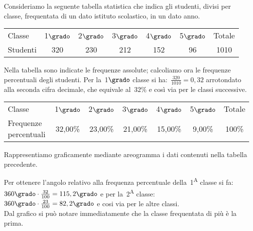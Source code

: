  \begin{esempio}
Consideriamo la seguente tabella statistica che indica gli studenti, divisi 
per classe, frequentata di un dato istituto scolastico, in un dato anno.

\begin{center}
\begin{tabular}{lcccccc}
\toprule
Classe & 1\(\grado\) &2\(\grado\) &3\(\grado\) & 4\(\grado\) &5\(\grado\) &Totale\\
Studenti & 320 & 230 & 212 & 152 & 96 & 1010 \\
\bottomrule
\end{tabular}
\end{center}

Nella tabella sono indicate le frequenze assolute; calcoliamo ora le 
frequenze percentuali degli studenti.
Per la~1\(\grado\) classe si ha:~\(\frac{320}{1010}=0,32\) arrotondato alla 
seconda cifra decimale, che equivale al~\(32\%\) e così via per le classi 
successive.

\begin{center}
\begin{tabular}{lcccccc}
\toprule
Classe & 1\(\grado\) & 2\(\grado\) & 3\(\grado\) & 4\(\grado\) & 5\(\grado\) & Totale 
\\
 Frequenze percentuali& 32,00\% & 23,00\% & 21,00\% & 15,00\% & 9,00\% & 
100\% \\
\bottomrule
\end{tabular}
\end{center}

Rappresentiamo graficamente mediante areogramma i dati contenuti nella 
tabella precedente.

\begin{minipage}{.49 \textwidth}
Per ottenere l'angolo relativo alla frequenza percentuale 
della~1\textsuperscript{A} 
classe si fa:~\(360\grado \cdot \frac{32}{100}=115,2\grado\) e per 
la~2\textsuperscript{A} classe:~\(360\grado \cdot \frac{23}{100}=82,2\grado\) e 
cosi via per le altre classi. \\
Dal grafico si può notare immediatamente che la classe frequentata di più è 
la prima.
\end{minipage}
\hfill
\begin{minipage}{.49 \textwidth}
\begin{center}
%  
 \scalebox{.7}{}  
\end{center}
\end{minipage}
 \end{esempio}

